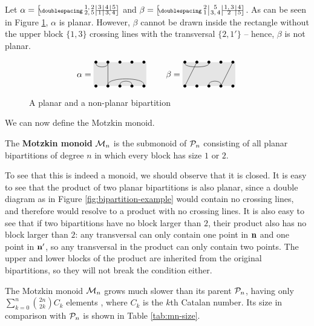 \begin{example}
  Let $\alpha = \bipart{c|c|c|c}{2-4}{1,2 &3 &4 &5}{2,5 &1 &\mc2{c}{3,4}}$ and
  $\beta = \bipart{c|c|c|c}{3-4}{2 &5 &1,3 &4}{1 &3,4 &2 &5}$.  As can be seen
  in Figure \ref{fig:planar}, $\alpha$ is planar.  However, $\beta$ cannot be
  drawn inside the rectangle without the upper block $\{1,3\}$ crossing lines
  with the transversal $\{2, 1'\}$ -- hence, $\beta$ is not planar.
\end{example}

\begin{figure}[ht]
  \centering
  $$\alpha = \bipartdiag{\tc12\tv22\bC25 \bc34} \qquad
  \beta = \bipartdiag{\tc13 \tv21 \tv54\bc34}$$
  \caption{A planar and a non-planar bipartition}
  \label{fig:planar}
\end{figure}

We can now define the Motzkin monoid.

\begin{definition}
  \label{def:motzkin}
  The \textbf{Motzkin monoid} $\mathcal{M}_n$ is the submonoid of $\mathcal{P}_n$ consisting
  of all planar bipartitions of degree $n$ in which every block has size $1$ or
  $2$.
\end{definition}

To see that this is indeed a monoid, we should observe that it is closed.  It is
easy to see that the product of two planar bipartitions is also planar, since a
double diagram as in Figure \ref{fig:bipartition-example} would contain no
crossing lines, and therefore would resolve to a product with no crossing lines.
It is also easy to see that if two bipartitions have no block larger than $2$,
their product also has no block larger than $2$: any transversal can only
contain one point in $\mathbf{n}$ and one point in $\mathbf{n}'$, so any transversal in the
product can only contain two points.  The upper and lower blocks of the product
are inherited from the original bipartitions, so they will not break the
condition either.

The Motzkin monoid $\mathcal{M}_n$ grows much slower than its parent $\mathcal{P}_n$, having
only $\sum_{k=0}^n \binom{2n}{2k}C_k$ elements
, where $C_k$ is the $k$th
Catalan number.  Its size in comparison with $\mathcal{P}_n$ is shown in Table
\ref{tab:mn-size}.

